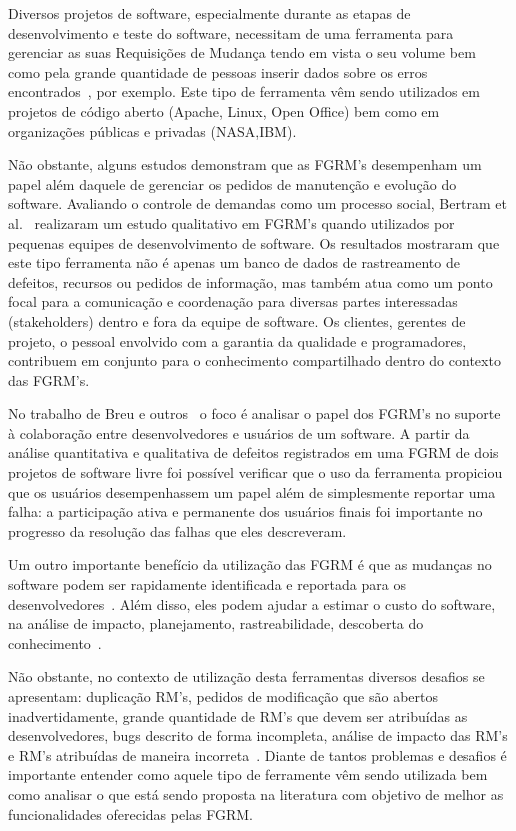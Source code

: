Diversos projetos de software, especialmente durante as etapas de
desenvolvimento e teste do software, necessitam de uma ferramenta para gerenciar
as suas Requisições de Mudança tendo em vista o seu volume bem como pela grande
quantidade de pessoas inserir dados sobre os erros encontrados~\cite{1407819},
por exemplo. Este tipo de ferramenta vêm sendo utilizados em projetos de código
aberto (Apache, Linux, Open Office) bem como em organizações públicas e privadas
(NASA,IBM).

Não obstante, alguns estudos demonstram que as FGRM's desempenham um papel além
daquele de gerenciar os pedidos de manutenção e evolução do software. Avaliando
o controle de demandas como um processo social, Bertram et
al.~\cite{Bertram:2010:CCB:1718918.1718972} realizaram um estudo qualitativo em
FGRM's quando utilizados por pequenas equipes de desenvolvimento de software. Os
resultados mostraram que este tipo ferramenta não é apenas um banco de dados de
rastreamento de defeitos, recursos ou pedidos de informação, mas também atua
como um ponto focal para a comunicação e coordenação para diversas partes
interessadas (stakeholders) dentro e fora da equipe de software. Os clientes,
gerentes de projeto, o pessoal envolvido com a garantia da qualidade e
programadores, contribuem em conjunto para o conhecimento compartilhado dentro
do contexto das FGRM's.

No trabalho de Breu e outros~\cite{Breu:2010:INB:1718918.1718973} o foco é
analisar o papel dos FGRM's no suporte à colaboração entre desenvolvedores e
usuários de um software. A partir da análise quantitativa e qualitativa de
defeitos registrados em uma FGRM de dois projetos de software livre foi possível
verificar que o uso da ferramenta propiciou que os usuários desempenhassem um
papel além de simplesmente reportar uma falha: a participação ativa e permanente
dos usuários finais foi importante no progresso da resolução das falhas que eles
descreveram.


Um outro importante benefício da utilização das FGRM é que as mudanças no
software podem ser rapidamente identificada e reportada para os
desenvolvedores~\cite{anvik2005coping}. Além disso, eles podem ajudar a estimar
o custo do software, na análise de impacto, planejamento, rastreabilidade,
descoberta do conhecimento~\cite{cavalcanti2013bug}.

Não obstante, no contexto de utilização desta ferramentas diversos desafios se
apresentam: duplicação RM's, pedidos de modificação que são abertos
inadvertidamente, grande quantidade de RM's que devem ser atribuídas as
desenvolvedores, bugs descrito de forma incompleta, análise de impacto das RM's
e RM's atribuídas de maneira incorreta~\cite{cavalcanti2014challenges}.  Diante
de tantos problemas e desafios é importante entender como aquele tipo de
ferramente vêm sendo utilizada bem como analisar o que está sendo proposta na
literatura com objetivo de melhor as funcionalidades oferecidas pelas FGRM\@.

